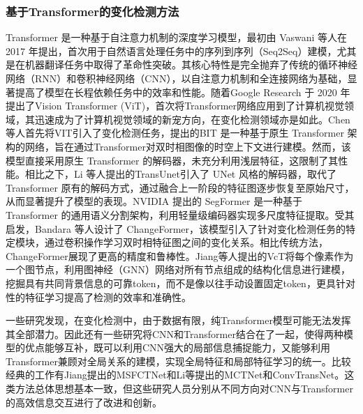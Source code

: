 \documentclass[lang=chs, degree=master, blindreview=false, adobe=false]{yanputhesis}
\begin{document}
\subsubsection{基于Transformer的变化检测方法}
Transformer 是一种基于自注意力机制的深度学习模型，最初由 Vaswani 等人在 2017 年提出\cite{vaswani2017transformer}，首次用于自然语言处理任务中的序列到序列（Seq2Seq）建模，尤其是在机器翻译任务中取得了革命性突破。其核心特性是完全抛弃了传统的循环神经网络（RNN）和卷积神经网络（CNN），以自注意力机制和全连接网络为基础，显著提高了模型在长程依赖任务中的效率和性能。随着Google Research 于 2020 年提出了Vision Transformer (ViT)\cite{dosovitskiy2020vit}，首次将Transformer网络应用到了计算机视觉领域，其迅速成为了计算机视觉领域的新宠方向，在变化检测领域亦是如此。Chen等人首先将VIT引入了变化检测任务，提出的BIT\cite{chen2021BIT} 是一种基于原生 Transformer 架构的网络，旨在通过Transformer对双时相图像的时空上下文进行建模。然而，该模型直接采用原生 Transformer 的解码器，未充分利用浅层特征，这限制了其性能。相比之下，Li 等人提出的TransUnet\cite{li2022transunetcd}引入了 UNet 风格的解码器，取代了 Transformer 原有的解码方式，通过融合上一阶段的特征图逐步恢复至原始尺寸，从而显著提升了模型的表现。NVIDIA 提出的 SegFormer \cite{xie2021segformer}是一种基于 Transformer 的通用语义分割架构，利用轻量级编码器实现多尺度特征提取。受其启发，Bandara 等人设计了 ChangeFormer\cite{bandara2022transformer}，该模型引入了针对变化检测任务的特定模块，通过卷积操作学习双时相特征图之间的变化关系。相比传统方法，ChangeFormer展现了更高的精度和鲁棒性。Jiang等人提出的VcT\cite{jiang2023vct}将每个像素作为一个图节点，利用图神经（GNN）网络对所有节点组成的结构化信息进行建模，挖掘具有共同背景信息的可靠token，而不是像以往手动设置固定token，更具针对性的特征学习提高了检测的效率和准确性。

一些研究发现，在变化检测中，由于数据有限，纯Transformer模型可能无法发挥其全部潜力。因此还有一些研究将CNN和Transformer结合在了一起，使得两种模型的优点能够互补，既可以利用CNN强大的局部信息捕捉能力，又能够利用Transformer兼顾对全局关系的建模，实现全局特征和局部特征学习的统一。比较经典的工作有Jiang提出的MSFCTNet\cite{jiang2024cnntranscd}和Li等提出的MCTNet\cite{lwm2023cnntransCD2}和ConvTransNet\cite{lwm2023cnntransCD}。这类方法总体思想基本一致，但这些研究人员分别从不同方向对CNN与Transformer的高效信息交互进行了改进和创新。
\end{document}
